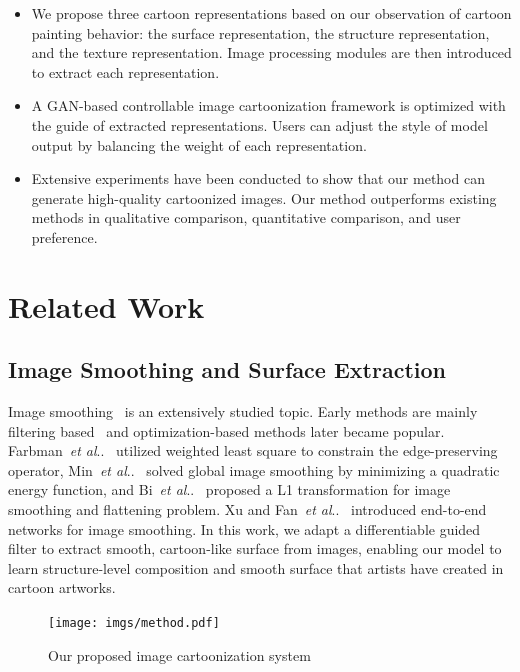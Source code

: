 \documentclass[10pt,twocolumn,letterpaper]{article}
\makeatletter
\DeclareRobustCommand\onedot{\futurelet\@let@token\@onedot}
\def\@onedot{\ifx\@let@token.\else.\null\fi\xspace}
\def\etal{\emph{et al}\onedot}
\makeatother
\begin{document}
\begin{itemize}
\setlength{\itemsep}{0.5pt}
\setlength{\parsep}{0pt}
\setlength{\parskip}{0pt}
\item We propose three cartoon representations based on our observation of cartoon painting behavior: the surface representation, the structure representation, and the texture representation. Image processing modules are then introduced to extract each representation.
\item A GAN-based controllable image cartoonization framework is optimized with the guide of extracted representations. Users can adjust the style of model output by balancing the weight of each representation.
\item Extensive experiments have been conducted to show that our method can generate high-quality cartoonized images. Our method outperforms existing methods in qualitative comparison, quantitative comparison, and user preference.
\end{itemize}
\vspace{-0.3em}
\section{Related Work}
\vspace{-0.3em}
\subsection{Image Smoothing and Surface Extraction}
Image smoothing~\cite{tomasi1998bilateral, he2010guided, farbman2008edge, min2014fast, bi20151} is an extensively studied topic. Early methods are mainly filtering based~\cite{tomasi1998bilateral, he2010guided} and optimization-based methods later became popular. Farbman~\etal~\cite{farbman2008edge} utilized weighted least square to constrain the edge-preserving operator, Min~\etal~\cite{min2014fast} solved global image smoothing by minimizing a quadratic energy function, and Bi~\etal~\cite{bi20151} proposed a L1 transformation for image smoothing and flattening problem. Xu and Fan~\etal~\cite{xu2015deep, fan2017generic, fan2018image} introduced end-to-end networks for image smoothing. In this work, we adapt a differentiable guided filter \cite{wu2018fast} to extract smooth, cartoon-like surface from images, enabling our model to learn structure-level composition and smooth surface that artists have created in cartoon artworks.
 
\begin{figure}[t]
\centering
\texttt{[image: imgs/method.pdf]}
\caption{Our proposed image cartoonization system}
\label{fig:framework}
\vspace{-1em}
\end{figure}
\end{document}
